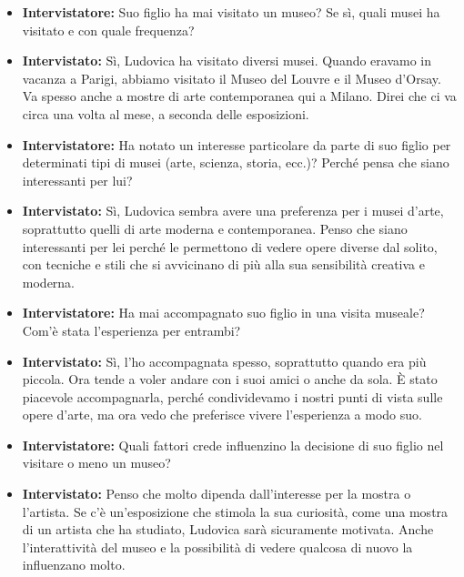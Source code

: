 \documentclass{article}
\begin{document}
\begin{itemize}
    \item \textbf{Intervistatore:} Suo figlio ha mai visitato un museo? Se sì, quali musei ha visitato e con quale frequenza?
    \item \textbf{Intervistato:} Sì, Ludovica ha visitato diversi musei. Quando eravamo in vacanza a Parigi, abbiamo visitato il Museo del Louvre e il Museo d'Orsay. Va spesso anche a mostre di arte contemporanea qui a Milano. Direi che ci va circa una volta al mese, a seconda delle esposizioni.
    
    \item \textbf{Intervistatore:} Ha notato un interesse particolare da parte di suo figlio per determinati tipi di musei (arte, scienza, storia, ecc.)? Perché pensa che siano interessanti per lui?
    \item \textbf{Intervistato:} Sì, Ludovica sembra avere una preferenza per i musei d’arte, soprattutto quelli di arte moderna e contemporanea. Penso che siano interessanti per lei perché le permettono di vedere opere diverse dal solito, con tecniche e stili che si avvicinano di più alla sua sensibilità creativa e moderna.
    
    \item \textbf{Intervistatore:} Ha mai accompagnato suo figlio in una visita museale? Com'è stata l’esperienza per entrambi?
    \item \textbf{Intervistato:} Sì, l’ho accompagnata spesso, soprattutto quando era più piccola. Ora tende a voler andare con i suoi amici o anche da sola. È stato piacevole accompagnarla, perché condividevamo i nostri punti di vista sulle opere d’arte, ma ora vedo che preferisce vivere l’esperienza a modo suo.
    
    \item \textbf{Intervistatore:} Quali fattori crede influenzino la decisione di suo figlio nel visitare o meno un museo?
    \item \textbf{Intervistato:} Penso che molto dipenda dall’interesse per la mostra o l'artista. Se c'è un’esposizione che stimola la sua curiosità, come una mostra di un artista che ha studiato, Ludovica sarà sicuramente motivata. Anche l’interattività del museo e la possibilità di vedere qualcosa di nuovo la influenzano molto.
\end{itemize}
\end{document}
